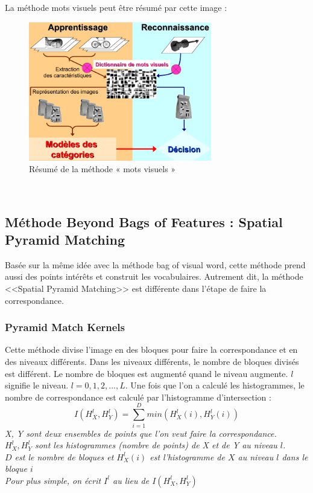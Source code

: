 \documentclass[french,12pt,a4paper,oneside,notitlepage]{report}
\begin{document}
\pagebreak
La méthode mots visuels peut être résumé par cette image :
\begin{figure}[ht]
	\begin{center}
	  \includegraphics[width=8cm]{img2.png}
	\end{center}
	 \caption{Résumé de la méthode « mots visuels »}
\end{figure}\\

\subsection{Méthode Beyond Bags of Features : Spatial Pyramid Matching}
Basée sur la même idée avec la méthode bag of visual word, cette méthode prend aussi des points intérêts et construit les vocabulaires. Autrement dit, la méthode <<Spatial Pyramid Matching>> est différente dans l'étape de faire la correspondance.

\subsubsection{Pyramid Match Kernels}
Cette méthode divise l'image en des bloques pour faire la correspondance et en des niveaux différents. Dans les niveaux différents, le nombre de bloques divisés est différent. Le nombre de bloques est augmenté quand le niveau augmente. $l$ signifie le niveau. $l = 0, 1, 2, ..., L$.
Une fois que l'on a calculé les histogrammes, le nombre de correspondance est calculé par l'histogramme d'intersection :
\begin{equation}
I(H^l_X,H^l_Y) = \sum_{i=1}^{D} min(H^l_X(i),H^l_Y(i))
\end{equation}
\textit{X, Y sont deux ensembles de points que l'on veut faire la correspondance.}\\
\textit{$H^l_X, H^l_Y$ sont les histogrammes (nombre de points) de X et de Y au niveau $l$.}\\
\textit{$D$ est le nombre de bloques et $H^l_X(i)$ est l'histogramme de $X$ au niveau $l$ dans le bloque $i$}\\
\textit{Pour plus simple, on écrit $I^l$ au lieu de $I(H^l_X,H^l_Y)$}\\
\end{document}
